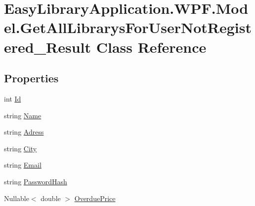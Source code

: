 \hypertarget{class_easy_library_application_1_1_w_p_f_1_1_model_1_1_get_all_librarys_for_user_not_registered___result}{}\section{Easy\+Library\+Application.\+W\+P\+F.\+Model.\+Get\+All\+Librarys\+For\+User\+Not\+Registered\+\_\+\+Result Class Reference}
\label{class_easy_library_application_1_1_w_p_f_1_1_model_1_1_get_all_librarys_for_user_not_registered___result}
\subsection*{Properties}
\begin{DoxyCompactItemize}
\item 
int \mbox{\hyperlink{class_easy_library_application_1_1_w_p_f_1_1_model_1_1_get_all_librarys_for_user_not_registered___result_aacb745048f6d1df63691ae9ee85705c4}{Id}}
\item 
string \mbox{\hyperlink{class_easy_library_application_1_1_w_p_f_1_1_model_1_1_get_all_librarys_for_user_not_registered___result_aa32981f2654adfea03ba9a38038c8263}{Name}}
\item 
string \mbox{\hyperlink{class_easy_library_application_1_1_w_p_f_1_1_model_1_1_get_all_librarys_for_user_not_registered___result_a6d7f0dac56fe10dd0d5a1f4abccbefb8}{Adress}}
\item 
string \mbox{\hyperlink{class_easy_library_application_1_1_w_p_f_1_1_model_1_1_get_all_librarys_for_user_not_registered___result_a2e9cd1d8b48a322f3282b915ef404f7a}{City}}
\item 
string \mbox{\hyperlink{class_easy_library_application_1_1_w_p_f_1_1_model_1_1_get_all_librarys_for_user_not_registered___result_a437b1b65193158409783537deaff6e6e}{Email}}
\item 
string \mbox{\hyperlink{class_easy_library_application_1_1_w_p_f_1_1_model_1_1_get_all_librarys_for_user_not_registered___result_a1d11a4745d65746db9539cf7597626e8}{Password\+Hash}}
\item 
Nullable$<$ double $>$ \mbox{\hyperlink{class_easy_library_application_1_1_w_p_f_1_1_model_1_1_get_all_librarys_for_user_not_registered___result_a0e4b51c3070af21ac70bf3300bd1a916}{Overdue\+Price}}
\end{DoxyCompactItemize}


